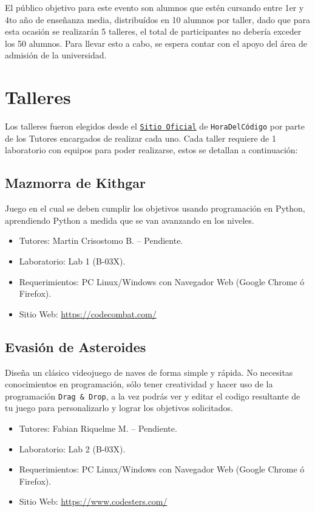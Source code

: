 \documentclass[letterpaper,12pt]{article}
\begin{document}
El público objetivo para este evento son alumnos que estén cursando entre 1er y 4to año de enseñanza media, distribuídos en 10 alumnos por taller, dado que para esta ocasión se realizarán 5 talleres, el total de participantes no debería exceder los 50 alumnos. Para llevar esto a cabo, se espera contar con el apoyo del área de admisión de la universidad.

\section{Talleres}

Los talleres fueron elegidos desde el \texttt{\href{https://hourofcode.com/es/learn}{Sitio Oficial}} de \texttt{HoraDelCódigo} por parte de los Tutores encargados de realizar cada uno. Cada taller requiere de 1 laboratorio con equipos para poder realizarse, estos se detallan a continuación:

\subsection{Mazmorra de Kithgar}

 Juego en el cual se deben cumplir los objetivos usando programación en Python, aprendiendo Python a medida que se van avanzando en los niveles.

\begin{itemize}
    \item Tutores: Martin Crisostomo B. -- Pendiente.
    \item Laboratorio: Lab 1 (B-03X).
    \item Requerimientos: PC Linux/Windows con Navegador Web (Google Chrome ó Firefox).
    \item Sitio Web: \href{https://codecombat.com/play/dungeon?hour_of_code=true}{https://codecombat.com/}
\end{itemize}

\subsection{Evasión de Asteroides}

Diseña un clásico videojuego de naves de forma simple y rápida. No necesitas conocimientos en programación, sólo tener creatividad y hacer uso de la programación \texttt{Drag \& Drop}, a la vez podrás ver y editar el codigo resultante de tu juego para personalizarlo y lograr los objetivos solicitados. 

\begin{itemize}
    \item Tutores: Fabian Riquelme M. -- Pendiente.
    \item Laboratorio: Lab 2 (B-03X).
    \item Requerimientos: PC Linux/Windows con Navegador Web (Google Chrome ó Firefox).
    \item Sitio Web: \href{https://www.codesters.com/curriculum/hour-of-code-2017/Evasi%25C3%25B3n+de+Asteroides/25/}{https://www.codesters.com/}

\end{itemize}
\end{document}
